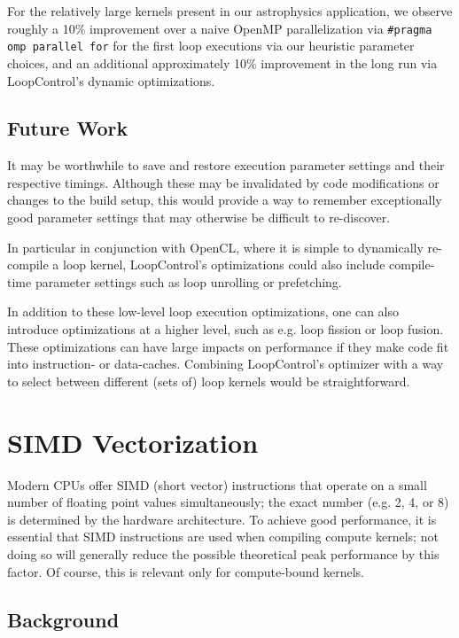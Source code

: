 \documentclass[conference]{IEEEtran}
\begin{document}
For the relatively large kernels present in our
astrophysics application, we observe roughly a 10\% improvement over a
naive OpenMP parallelization via \verb+#pragma omp parallel for+
for the first loop executions via our heuristic parameter choices, and
an additional approximately 10\% improvement in the long run via
LoopControl's dynamic optimizations.

\subsection{Future Work}

It may be worthwhile to save and restore execution parameter settings
and their respective timings. Although these may be invalidated by
code modifications or changes to the build setup, this would provide a
way to remember exceptionally good parameter settings that may
otherwise be difficult to re-discover.

In particular in conjunction with OpenCL, where it is simple to
dynamically re-compile a loop kernel, LoopControl's optimizations could
also include compile-time parameter settings such as loop unrolling or
prefetching.

In addition to these low-level loop execution optimizations, one can
also introduce optimizations at a higher level, such as e.g. loop
fission or loop fusion. These optimizations can have large impacts on
performance if they make code fit into instruction- or data-caches.
Combining LoopControl's optimizer with a way to select between
different (sets of) loop kernels would be straightforward.



\section{SIMD Vectorization}
\label{sec:vectorization}

Modern CPUs offer SIMD (short vector) instructions that operate on a
small number of floating point values simultaneously; the exact number
(e.g. 2, 4, or 8) is determined by the hardware
architecture.
To achieve good performance, it is essential that SIMD
instructions are used when compiling compute kernels; not doing so
will generally reduce the possible theoretical peak performance by
this factor. Of course, this is relevant only for compute-bound
kernels.

\subsection{Background}
\end{document}
